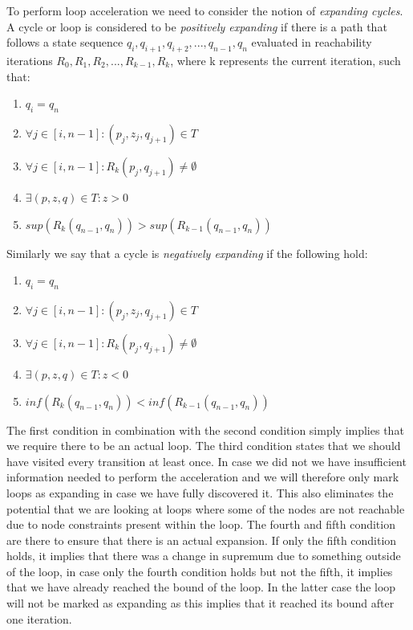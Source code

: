\documentclass[12pt]{article}
\begin{document}
To perform loop acceleration we need to consider the notion of \textit{expanding cycles}. A cycle or loop is considered to be \textit{positively expanding} if there is a path that follows a state sequence $q_i, q_{i+1}, q_{i+2}, ..., q_{n-1}, q_n$ evaluated in reachability iterations $R_0, R_{1}, R_{2}, ..., R_{k-1}, R_{k}$, where k represents the current iteration, such that:
\begin{enumerate}
	\item $q_i = q_n$
	\item $\forall j \in [i, n-1]: (p_j, z_j, q_{j+1}) \in T$
	\item $\forall j \in [i, n-1]: R_k(p_j, q_{j+1}) \ne \emptyset$
	\item $\exists (p, z, q) \in T: z > 0$
	\item $sup(R_k(q_{n-1}, q_{n})) > sup(R_{k-1}(q_{n-1}, q_n))$
\end{enumerate}

Similarly we say that a cycle is \textit{negatively expanding} if the following hold:
\begin{enumerate}
	\item $q_i = q_n$
	\item $\forall j \in [i, n-1] : (p_j, z_j, q_{j+1}) \in T$
	\item $\forall j \in [i, n-1]: R_k(p_j, q_{j+1}) \ne \emptyset$
	\item $\exists (p, z, q) \in T: z < 0$
	\item $inf(R_k(q_{n-1}, q_{n})) < inf(R_{k-1}(q_{n-1}, q_n))$
\end{enumerate}

The first condition in combination with the second condition simply implies that we require there to be an actual loop. The third condition states that we should have visited every transition at least once. In case we did not we have insufficient information needed to perform the acceleration and we will therefore only mark loops as expanding in case we have fully discovered it. This also eliminates the potential that we are looking at loops where some of the nodes are not reachable due to node constraints present within the loop. The fourth and fifth condition are there to ensure that there is an actual expansion. If only the fifth condition holds, it implies that there was a change in supremum due to something outside of the loop, in case only the fourth condition holds but not the fifth, it implies that we have already reached the bound of the loop. In the latter case the loop will not be marked as expanding as this implies that it reached its bound after one iteration.
\end{document}
